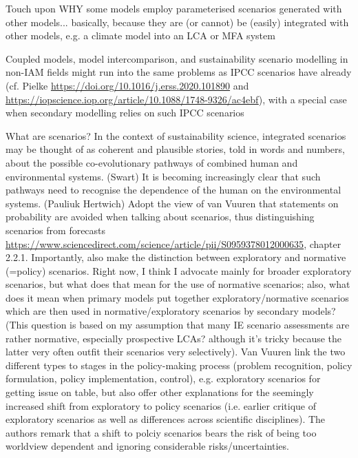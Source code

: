 \documentclass{article}
\begin{document}
Touch upon WHY some models employ parameterised scenarios generated with other models... basically, because they are (or cannot) be (easily) integrated with other models, e.g. a climate model into an LCA or MFA system

Coupled models, model intercomparison, and sustainability scenario modelling in non-IAM fields might run into the same problems as IPCC scenarios have already (cf. Pielke \url{https://doi.org/10.1016/j.erss.2020.101890} and \url{https://iopscience.iop.org/article/10.1088/1748-9326/ac4ebf}), with a special case when secondary modelling relies on such IPCC scenarios

What are scenarios? In the context of sustainability
science, integrated scenarios may be thought of as
coherent and plausible stories, told in words and
numbers, about the possible co-evolutionary pathways
of combined human and environmental systems. (Swart)
It is becoming increasingly clear that such pathways need to recognise the dependence of the human on the environmental systems. (Pauliuk Hertwich)
Adopt the view of van Vuuren that statements on probability are avoided when talking about scenarios, thus distinguishing scenarios from forecasts \url{https://www.sciencedirect.com/science/article/pii/S0959378012000635}, chapter 2.2.1. Importantly, also make the distinction between exploratory and normative (=policy) scenarios. Right now, I think I advocate mainly for broader exploratory scenarios, but what does that mean for the use of normative scenarios; also, what does it mean when primary models put together exploratory/normative scenarios which are then used in normative/exploratory scenarios by secondary models? (This question is based on my assumption that many IE scenario assessments are rather normative, especially prospective LCAs? although it's tricky because the latter very often outfit their scenarios very selectively). Van Vuuren link the two different types to stages in the policy-making process (problem recognition, policy formulation, policy implementation, control), e.g. exploratory scenarios for getting issue on table, but also offer other explanations for the seemingly increased shift from exploratory to policy scenarios (i.e. earlier critique of exploratory scenarios as well as differences across scientific disciplines). The authors remark that a shift to polciy scenarios bears the risk of being too worldview dependent and ignoring considerable risks/uncertainties.
\end{document}
